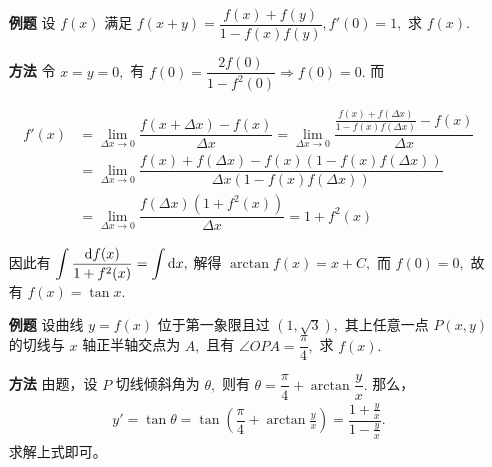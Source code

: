 
\begin{enumerate}
    \item[\textbf{例题}] 
    设 $ f(x) $ 满足 $ f(x+y)=\dfrac{f(x)+f(y)}{1-f(x)f(y)}, f'(0) = 1, $ 
    求 $ f(x). $ 
    \item[\textbf{方法}] 
    令 $ x = y = 0, $ 有 $ f(0) = \dfrac{2f(0)}{1-f^2(0)} \Rightarrow f(0) = 0. $ 而

    \begin{equation*}
        \begin{aligned}
            f'(x) &= {\displaystyle\lim_{\Delta x\rightarrow 0}}
            \dfrac{f(x+\Delta x) - f(x)}{\Delta x} 
            = {\displaystyle\lim_{\Delta x\rightarrow 0}}
            \dfrac{\frac{f(x)+f(\Delta x)}{1-f(x)f(\Delta x)}-f(x)}{\Delta x}\\ 
            &= {\displaystyle\lim_{\Delta x\rightarrow 0}}
            \dfrac{f(x)+f(\Delta x)-f(x)(1-f(x)f(\Delta x))}{\Delta x(1-f(x)f(\Delta x))}\\
            &= {\displaystyle\lim_{\Delta x\rightarrow 0}}
            \dfrac{f(\Delta x)(1+f^2(x))}{\Delta x}
            = 1+f^2(x)
        \end{aligned}
    \end{equation*}

    因此有 $ \displaystyle \int \dfrac{\mathrm{d}f(x)}{1+f^2(x)} = \int \mathrm{d}x, $ 
    解得 $ \arctan f(x) = x + C, $ 而 $ f(0) = 0, $ 故有 $ f(x) = \tan x. $ 
\end{enumerate}


\begin{enumerate}
    \item[\textbf{例题}] 设曲线 $ y = f(x) $ 位于第一象限且过 $ (1,\sqrt{3}), $ 
    其上任意一点 $ P(x,y) $ 的切线与 $ x $ 轴正半轴交点为 $ A, $ 且有
    $ \angle OPA = \dfrac{\pi}{4}, $ 求 $ f(x). $ 
    \item[\textbf{方法}] 
    由题，设 $ P $ 切线倾斜角为 $ \theta, $ 则有 $ \theta = \dfrac{\pi}{4} + \arctan \dfrac{y}{x}. $ 
    那么，
    \begin{equation*}
        \begin{aligned}
            y' = \tan \theta = \tan(\dfrac{\pi}{4}+\arctan \frac{y}{x}) = 
            \dfrac{1 + \frac{y}{x}}{1 - \frac{y}{x}}.
        \end{aligned}
    \end{equation*}
    求解上式即可。
\end{enumerate}

